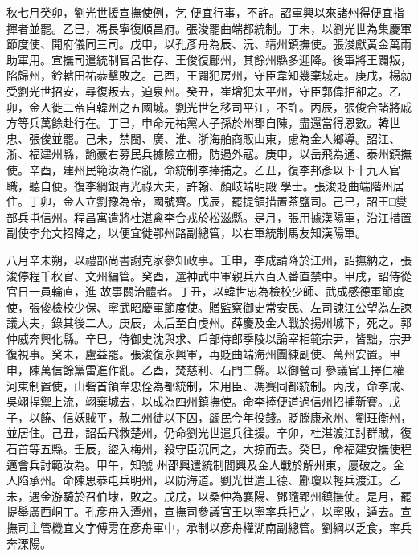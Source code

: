 \begin{pinyinscope}
 秋七月癸卯，劉光世援宣撫使例，乞
 便宜行事，不許。詔軍興以來諸州得便宜指揮者並罷。乙巳，馮長寧復順昌府。張浚罷曲端都統制。丁未，以劉光世為集慶軍節度使、開府儀同三司。戊申，以孔彥舟為辰、沅、靖州鎮撫使。張浚獻黃金萬兩助軍用。宣撫司遣統制官呂世存、王俊復鄜州，其餘州縣多迎降。後軍將王闢叛，陷歸州，鈐轄田祐恭擊敗之。己酉，王闢犯房州，守臣韋知幾棄城走。庚戌，楊勍受劉光世招安，尋復叛去，迫泉州。癸丑，崔增犯太平州，守臣郭偉拒卻之。乙
 卯，金人徙二帝自韓州之五國城。劉光世乞移司平江，不許。丙辰，張俊合諸將戚方等兵萬餘赴行在。丁巳，申命元祐黨人子孫於州郡自陳，盡還當得恩數。韓世忠、張俊並罷。己未，禁閩、廣、淮、浙海舶商販山東，慮為金人鄉導。詔江、浙、福建州縣，諭豪右募民兵據險立柵，防遏外寇。庚申，以岳飛為通、泰州鎮撫使。辛酉，建州民範汝為作亂，命統制李捧捕之。乙丑，復李邦彥以下十九人官職，聽自便。復李綱銀青光祿大夫，許翰、顏岐端明殿
 學士。張浚貶曲端階州居住。丁卯，金人立劉豫為帝，國號齊。戊辰，罷提領措置茶鹽司。己巳，詔王□燮部兵屯信州。程昌寓遣將杜湛禽李合戎於松滋縣。是月，張用據漢陽軍，沿江措置副使李允文招降之，以便宜徙鄂州路副總管，以右軍統制馬友知漢陽軍。



 八月辛未朔，以禮部尚書謝克家參知政事。壬申，李成請降於江州，詔撫納之，張浚停程千秋官、文州編管。癸酉，選神武中軍親兵六百人番直禁中。甲戌，詔侍從官日一員輪直，進
 故事關治體者。丁丑，以韓世忠為檢校少師、武成感德軍節度使，張俊檢校少保、寧武昭慶軍節度使。贈監察御史常安民、左司諫江公望為左諫議大夫，錄其後二人。庚辰，太后至自虔州。薛慶及金人戰於揚州城下，死之。郭仲威奔興化縣。辛巳，侍御史沈與求、戶部侍郎季陵以論宰相範宗尹，皆黜，宗尹復視事。癸未，盧益罷。張浚復永興軍，再貶曲端海州團練副使、萬州安置。甲申，陳萬信餘黨雷進作亂。乙酉，焚慈利、石門二縣。以御營司
 參議官王擇仁權河東制置使，山砦首領韋忠佺為都統制，宋用臣、馮賽同都統制。丙戌，命李成、吳翊捍禦上流，翊棄城去，以成為四州鎮撫使。命李捧便道過信州招捕靳賽。戊子，以饒、信妖賊平，赦二州徒以下囚，蠲民今年役錢。貶滕康永州、劉玨衡州，並居住。己丑，詔岳飛救楚州，仍命劉光世遣兵往援。辛卯，杜湛渡江討群賊，復石首等五縣。壬辰，盜入梅州，殺守臣沉同之，大掠而去。癸巳，命福建安撫使程邁會兵討範汝為。甲午，知虢
 州邵興遣統制閻興及金人戰於解州東，屢破之。金人陷承州。命陳思恭屯兵明州，以防海道。劉光世遣王德、酈瓊以輕兵渡江。乙未，遇金游騎於召伯埭，敗之。戊戌，以桑仲為襄陽、鄧隨郢州鎮撫使。是月，罷提舉廣西峒丁。孔彥舟入潭州，宣撫司參議官王以寧率兵拒之，以寧敗，遁去。宣撫司主管機宜文字傅雱在彥舟軍中，承制以彥舟權湖南副總管。劉綱以乏食，率兵奔溧陽。




\end{pinyinscope}

